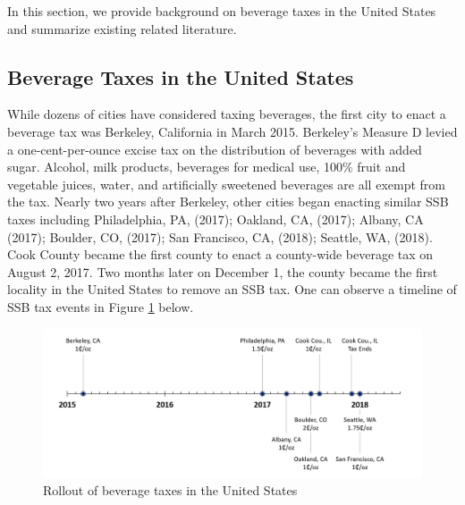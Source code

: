 \documentclass[12pt]{article}
\begin{document}
In this section, we provide background on beverage taxes in the United States and summarize existing related literature.

\subsection{Beverage Taxes in the United States}

While dozens of cities have considered taxing beverages, the first city to enact a beverage tax was Berkeley, California in March 2015. Berkeley's Measure D levied a one-cent-per-ounce excise tax on the distribution of beverages with added sugar. Alcohol, milk products, beverages for medical use, 100\% fruit and vegetable juices, water, and artificially sweetened beverages are all exempt from the tax. Nearly two years after Berkeley, other cities began enacting similar SSB taxes including Philadelphia, PA, (2017); Oakland, CA, (2017); Albany, CA (2017); Boulder, CO, (2017); San Francisco, CA, (2018); Seattle, WA, (2018). Cook County became the first county to enact a county-wide beverage tax on August 2, 2017. Two months later on December 1, the county became the first locality in the United States to remove an SSB tax. One can observe a timeline of SSB tax events in Figure \ref{taxtimeline} below.

\begin{figure}[t]\centering
\includegraphics[width = \textwidth]{../figures/taxtimeline.png}
\caption{Rollout of beverage taxes in the United States \label{taxtimeline}}
\end{figure}
\end{document}

